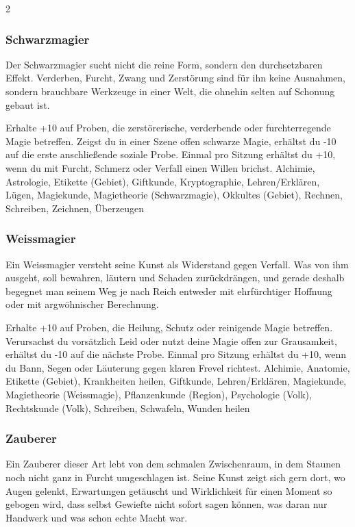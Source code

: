 {\begin{multicols*}{2}
        \subsubsection*{Schwarzmagier}
        Der Schwarzmagier sucht nicht die reine Form, sondern den durchsetzbaren Effekt. Verderben, Furcht, Zwang und Zerstörung sind für ihn keine Ausnahmen, sondern brauchbare Werkzeuge in einer Welt, die ohnehin selten auf Schonung gebaut ist.

        \wegespielwertebox
        {Erhalte +10 auf Proben, die zerstörerische, verderbende oder furchterregende Magie betreffen.}
        {Zeigst du in einer Szene offen schwarze Magie, erhältst du -10 auf die erste anschließende soziale Probe.}
        {Einmal pro Sitzung erhältst du +10, wenn du mit Furcht, Schmerz oder Verfall einen Willen brichst.}
        {Alchimie, Astrologie, Etikette (Gebiet), Giftkunde, Kryptographie, Lehren/Erklären, Lügen, Magiekunde, Magietheorie (Schwarzmagie), Okkultes (Gebiet), Rechnen, Schreiben, Zeichnen, Überzeugen}

        \subsubsection*{Weissmagier}
        Ein Weissmagier versteht seine Kunst als Widerstand gegen Verfall. Was von ihm ausgeht, soll bewahren, läutern und Schaden zurückdrängen, und gerade deshalb begegnet man seinem Weg je nach Reich entweder mit ehrfürchtiger Hoffnung oder mit argwöhnischer Berechnung.

        \wegespielwertebox
        {Erhalte +10 auf Proben, die Heilung, Schutz oder reinigende Magie betreffen.}
        {Verursachst du vorsätzlich Leid oder nutzt deine Magie offen zur Grausamkeit, erhältst du -10 auf die nächste Probe.}
        {Einmal pro Sitzung erhältst du +10, wenn du Bann, Segen oder Läuterung gegen klaren Frevel richtest.}
        {Alchimie, Anatomie, Etikette (Gebiet), Krankheiten heilen, Giftkunde, Lehren/Erklären, Magiekunde, Magietheorie (Weissmagie), Pflanzenkunde (Region), Psychologie (Volk), Rechtskunde (Volk), Schreiben, Schwafeln, Wunden heilen}

        \subsubsection*{Zauberer}
        Ein Zauberer dieser Art lebt von dem schmalen Zwischenraum, in dem Staunen noch nicht ganz in Furcht umgeschlagen ist. Seine Kunst zeigt sich gern dort, wo Augen gelenkt, Erwartungen getäuscht und Wirklichkeit für einen Moment so gebogen wird, dass selbst Gewiefte nicht sofort sagen können, was daran nur Handwerk und was schon echte Macht war.


\end{multicols*}}
